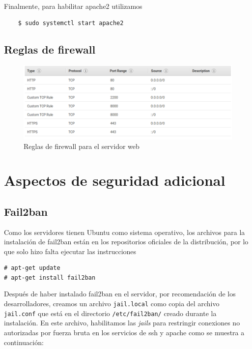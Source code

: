 \documentclass[12pt]{article}
\begin{document}
Finalmente, para habilitar \textsf{apache2} utilizamos
\begin{verbatim}
    $ sudo systemctl start apache2
\end{verbatim}

\subsection{Reglas de firewall}
\begin{figure}[H]
  \centering
  \includegraphics[width=\textwidth]{lamesec}
  \caption{Reglas de \textsf{firewall} para el servidor web}
\end{figure}


\section{Aspectos de seguridad adicional}\label{sec:sec}
\subsection{Fail2ban}
Como los servidores tienen \textsf{Ubuntu} como sistema operativo, los archivos para la instalación de \textsf{fail2ban} están en los repositorios oficiales de la distribución, por lo que solo hizo falta ejecutar las instrucciones
\begin{verbatim}
# apt-get update
# apt-get install fail2ban
\end{verbatim}
Después de haber instalado \textsf{fail2ban} en el servidor, por recomendación de los desarrolladores, creamos un archivo \texttt{jail.local} como copia del archivo \texttt{jail.conf} que está en el directorio \texttt{/etc/fail2ban/} creado durante la instalación. En este archivo, habilitamos las \textit{jails} para restringir conexiones no autorizadas por fuerza bruta en los servicios de \textsf{ssh} y \textsf{apache} como se muestra a continuación:
\end{document}
